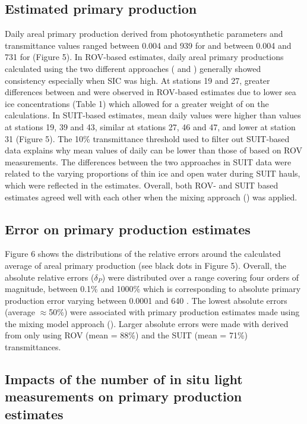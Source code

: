 \subsection{Estimated primary production}

Daily areal primary production derived from photosynthetic parameters and transmittance values ranged between 0.004 and 939 \dailypp{} for \ppunderice{} and between 0.004 and 731 \dailypp{} for \ppmixing{} (Figure 5). In ROV-based estimates, daily areal primary productions calculated using the two different approaches (\ppunderice{} and \ppmixing{}) generally showed consistency especially when SIC was high. At stations 19 and 27, greater differences between \ppunderice{} and \ppmixing{} were observed in ROV-based estimates due to lower sea ice concentrations (Table 1) which allowed for a greater weight of \ppopenwater{} on the calculations. In SUIT-based estimates, mean daily \ppunderice{} values were higher than \ppmixing{} values at stations 19, 39 and 43, similar at stations 27, 46 and 47, and lower at station 31 (Figure 5). The 10\% transmittance threshold used to filter out SUIT-based data explains why mean values of daily \ppunderice{} can be lower than those of based on ROV measurements. The differences between the two approaches in SUIT data were related to the varying proportions of thin ice and open water during SUIT hauls, which were reflected in the \ppunderice{} estimates. Overall, both ROV- and SUIT based estimates agreed well with each other when the mixing approach (\ppmixing{}) was applied.

\subsection{Error on primary production estimates}

Figure 6 shows the distributions of the relative errors around the calculated average of areal primary production (see black dots in Figure 5). Overall, the absolute relative errors ($\delta_P$) were distributed over a range covering four orders of magnitude, between 0.1\% and 1000\% which is corresponding to absolute primary production error varying between 0.0001 and 640 \dailypp{}. The lowest absolute errors (average $\approx$50\%) were associated with primary production estimates made using the mixing model approach (\ppmixing{}). Larger absolute errors were made with \ppunderice{} derived from only using ROV (mean = 88\%) and the SUIT (mean = 71\%) transmittances.

\subsection{Impacts of the number of in situ light measurements on primary production estimates}

